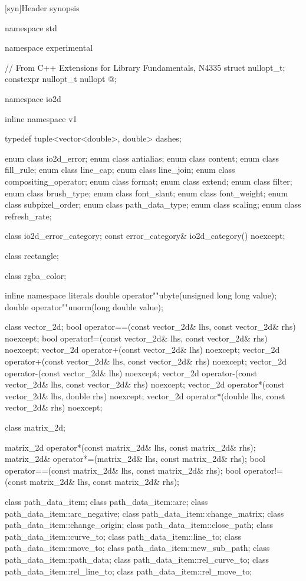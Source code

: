 [syn]{Header  synopsis}

%
\begin{codeblock}

namespace std { namespace experimental {
  // From C++ Extensions for Library Fundamentals, N4335
  struct nullopt_t;
  constexpr nullopt_t nullopt{ @\impdef@ };

  namespace io2d { inline namespace v1 {

  typedef tuple<vector<double>, double> dashes;

  enum class io2d_error;
  enum class antialias;
  enum class content;
  enum class fill_rule;
  enum class line_cap;
  enum class line_join;
  enum class compositing_operator;
  enum class format;
  enum class extend;
  enum class filter;
  enum class brush_type;
  enum class font_slant;
  enum class font_weight;
  enum class subpixel_order;
  enum class path_data_type;
  enum class scaling;
  enum class refresh_rate;

  class io2d_error_category;
  const error_category& io2d_category() noexcept;

  class rectangle;

  class rgba_color;

  inline namespace literals {
    double operator""ubyte(unsigned long long value);
    double operator""unorm(long double value);
  }
  
  class vector_2d;
  bool operator==(const vector_2d& lhs, const vector_2d& rhs) noexcept;
  bool operator!=(const vector_2d& lhs, const vector_2d& rhs) noexcept;
  vector_2d operator+(const vector_2d& lhs) noexcept;
  vector_2d operator+(const vector_2d& lhs, const vector_2d& rhs) noexcept;
  vector_2d operator-(const vector_2d& lhs) noexcept;
  vector_2d operator-(const vector_2d& lhs, const vector_2d& rhs) noexcept;
  vector_2d operator*(const vector_2d& lhs, double rhs) noexcept;
  vector_2d operator*(double lhs, const vector_2d& rhs) noexcept;

  class matrix_2d;

  matrix_2d operator*(const matrix_2d& lhs, const matrix_2d& rhs);
  matrix_2d& operator*=(matrix_2d& lhs, const matrix_2d& rhs);
  bool operator==(const matrix_2d& lhs, const matrix_2d& rhs);
  bool operator!=(const matrix_2d& lhs, const matrix_2d& rhs);

  class path_data_item;
  class path_data_item::arc;
  class path_data_item::arc_negative;
  class path_data_item::change_matrix;
  class path_data_item::change_origin;
  class path_data_item::close_path;
  class path_data_item::curve_to;
  class path_data_item::line_to;
  class path_data_item::move_to;
  class path_data_item::new_sub_path;
  class path_data_item::path_data;
  class path_data_item::rel_curve_to;
  class path_data_item::rel_line_to;
  class path_data_item::rel_move_to;

}}}}
\end{codeblock}

